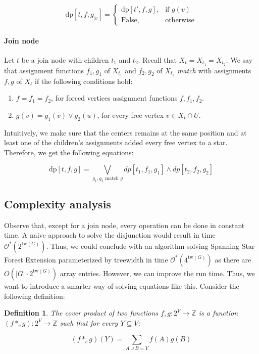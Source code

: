 \documentclass[en]{pracamgr}
\newtheorem{definition}{Definition}
\newcommand{\ssfep}{{\sc Spanning Star Forest Extension}}
\newcommand{\dpt}[1]{\textrm{dp}[#1]}
\newcommand{\false}{\textrm{False}}
\newcommand{\tw}{\textrm{tw}}
\begin{document}
\begin{equation*}
	\dpt{t,f,g_{|v}} =
	\begin{cases}
		\dpt{t',f,g}, & \text{if $g(v)$} \\
		\false, & \text{otherwise}
	\end{cases}
\end{equation*}

\paragraph{Join node} Let $t$ be a join node with children $t_1$ and $t_2$. Recall that $X_t=X_{t_1}=X_{t_2}$. We say that assignment functions $f_1,g_1$ of $X_{t_1}$ and $f_2,g_2$ of $X_{t_2}$ \textit{match} with assignments $f,g$ of $X_t$ if the following conditions hold:

\begin{enumerate}
	\item $f=f_1=f_2$, for forced vertices assignment functions $f,f_1,f_2$.
	\item $g(v)=g_1(v) \lor g_2(u)$, for every free vertex $v \in X_t \cap U$.
\end{enumerate}
Intuitively, we make sure that the centers remains at the same position and at least one of the children's assignments added every free vertex to a star. Therefore, we get the following equations:

\begin{equation*}
	\dpt{t,f,g} =
		\bigvee\limits_{g_1,g_2 \text{ match $g$}} dp[t_1,f_1,g_1] \land dp[t_2,f_2,g_2]
\end{equation*}

\subsection{Complexity analysis}

Observe that, except for a join node, every operation can be done in constant time. A naive approach to solve the disjunction would result in time $\mathcal{O}^*(2^{\tw(G)})$. Thus, we could conclude with an algorithm solving \ssfep{} parameterized by treewidth in time $\mathcal{O}^*(4^{\tw(G)})$ as there are $O(|G| \cdot 2^{\tw(G)})$ array entries. However, we can improve the run time. Thus, we want to introduce a smarter way of solving equations like this. Consider the following definition:

\begin{definition}
	The \textup{cover product} of two functions $f,g:2^V \rightarrow \mathbb{Z}$ is a function $(f *_c g):2^V \rightarrow \mathbb{Z}$ such that for every $Y \subseteq V$:
	
	\begin{equation*}
		(f *_c g)(Y) = \sum\limits_{ A \cup B = Y} f(A)g(B)
	\end{equation*}
\end{definition}
\end{document}

